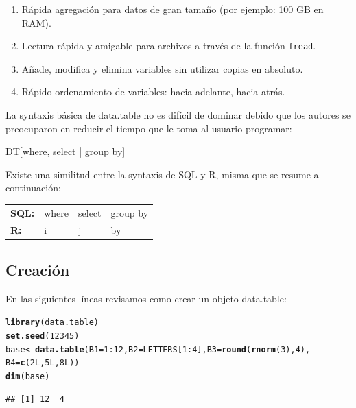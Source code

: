 \documentclass[11pt,a4paper,oneside]{book}\usepackage[]{graphicx}\usepackage[]{color}
\makeatletter
\newcommand{\hlnum}[1]{\textcolor[rgb]{0.686,0.059,0.569}{#1}}%
\newcommand{\hlopt}[1]{\textcolor[rgb]{0,0,0}{#1}}%
\newcommand{\hlstd}[1]{\textcolor[rgb]{0.345,0.345,0.345}{#1}}%
\newcommand{\hlkwb}[1]{\textcolor[rgb]{0.69,0.353,0.396}{#1}}%
\newcommand{\hlkwc}[1]{\textcolor[rgb]{0.333,0.667,0.333}{#1}}%
\newcommand{\hlkwd}[1]{\textcolor[rgb]{0.737,0.353,0.396}{\textbf{#1}}}%
\newenvironment{kframe}{%
 \def\at@end@of@kframe{}%
 \ifinner\ifhmode%
  \def\at@end@of@kframe{\end{minipage}}%
  \begin{minipage}{\columnwidth}%
 \fi\fi%
 \def\FrameCommand##1{\hskip\@totalleftmargin \hskip-\fboxsep
 \colorbox{shadecolor}{##1}\hskip-\fboxsep
     \hskip-\linewidth \hskip-\@totalleftmargin \hskip\columnwidth}%
 \MakeFramed {\advance\hsize-\width
   \@totalleftmargin\z@ \linewidth\hsize
   \@setminipage}}%
 {\par\unskip\endMakeFramed%
 \at@end@of@kframe}
\newenvironment{knitrout}{}{} %
\makeatother
\begin{document}
\begin{itemize}
\begin{enumerate}
   \item Rápida agregación para datos de gran tamaño (por ejemplo: 100 GB en RAM).
   \item Lectura rápida y amigable para archivos a través de la función \texttt{fread}.
   \item Añade, modifica y elimina variables sin utilizar copias en absoluto.
   \item Rápido ordenamiento de variables: hacia adelante, hacia atrás. 
\end{enumerate}

La syntaxis básica de data.table no es difícil de dominar debido que los autores se preocuparon en reducir el tiempo que le toma al usuario programar:

\begin{center}
{\Large DT[where, select | group by]}
\end{center}

Existe una similitud entre la syntaxis de SQL y R, misma que se resume a continuación: 
\begin{center}
\begin{tabular}{llll}
{\bf SQL:} & where & select & group by\\
{\bf R:} & i & j & by\\
\end{tabular}
\end{center}

\subsection{Creación}

En las siguientes líneas revisamos como crear un objeto data.table:
\begin{knitrout}
\color{fgcolor}\begin{kframe}
\begin{alltt}
\hlkwd{library}\hlstd{(data.table)}
\hlkwd{set.seed}\hlstd{(}\hlnum{12345}\hlstd{)}
\hlstd{base} \hlkwb{<-} \hlkwd{data.table}\hlstd{(}\hlkwc{B1}\hlstd{=}\hlnum{1}\hlopt{:}\hlnum{12}\hlstd{,} \hlkwc{B2}\hlstd{=LETTERS[}\hlnum{1}\hlopt{:}\hlnum{4}\hlstd{],} \hlkwc{B3}\hlstd{=}\hlkwd{round}\hlstd{(}\hlkwd{rnorm}\hlstd{(}\hlnum{3}\hlstd{),} \hlnum{4}\hlstd{),}
                   \hlkwc{B4}\hlstd{=}\hlkwd{c}\hlstd{(}\hlnum{2L}\hlstd{,} \hlnum{5L}\hlstd{,} \hlnum{8L}\hlstd{))}
\hlkwd{dim}\hlstd{(base)}
\end{alltt}
\begin{verbatim}
## [1] 12  4
\end{verbatim}
\end{kframe}
\end{knitrout}


\end{itemize}
\end{document}
